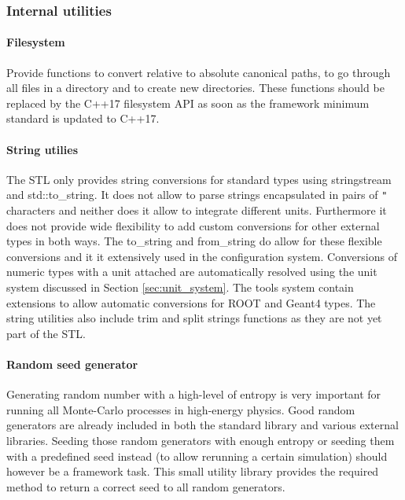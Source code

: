 \subsubsection{Internal utilities}
\paragraph{Filesystem}
\label{sec:filesystem}
Provide functions to convert relative to absolute canonical paths, to go through all files in a directory and to create new directories. These functions should be replaced by the C++17 filesystem API\cite{cppfilesystem} as soon as the framework minimum standard is updated to C++17.

\paragraph{String utilies}
\label{sec:string_utilities}
The STL only provides string conversions for standard types using stringstream and std::to\_string. It does not allow to parse strings encapsulated in pairs of \texttt{"} characters and neither does it allow to integrate different units. Furthermore it does not provide wide flexibility to add custom conversions for other external types in both ways. The \apsq to\_string and from\_string do allow for these flexible conversions and it it extensively used in the configuration system. Conversions of numeric types with a unit attached are automatically resolved using the unit system discussed in Section \ref{sec:unit_system}. The \apsq tools system contain extensions to allow automatic conversions for ROOT and Geant4 types. The string utilities also include trim and split strings functions as they are not yet part of the STL.

\paragraph{Random seed generator}
\label{sec:random_generator}
Generating random number with a high-level of entropy is very important for running all Monte-Carlo processes in high-energy physics. Good random generators are already included in both the standard library and various external libraries. Seeding those random generators with enough entropy or seeding them with a predefined seed instead (to allow rerunning a certain simulation) should however be a framework task. This small utility library provides the required method to return a correct seed to all random generators.

